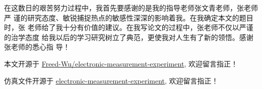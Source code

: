\documentclass[../main]{subfiles}
\begin{document}
\begin{acknowledgement}

  在这数日的艰苦努力过程中，我首先要感谢的是我的指导老师张文青老师，张老师严
  谨的研究态度、敏锐捕捉热点的敏感性深深的影响着我。在我确定本文的题目时，张
  老师给了我十分有价值的建议。在我写论文的过程中，张老师不仅以严谨的治学态度
  给我以后的学习研究树立了典范，更使我对人生有了新的领悟。感谢张老师的悉心指
  导！

  本文开源于
  \href{https://github.com/Freed-Wu/electronic-measurement-experiment}{Freed-Wu/electronic-measurement-experiment},
  欢迎留言指正！

  仿真文件开源于
  \href{https://www.tinkercad.com/things/fShI4dgF4dQ}{electronic-measurement-experiment},
  欢迎留言指正！
\end{acknowledgement}
\end{document}

